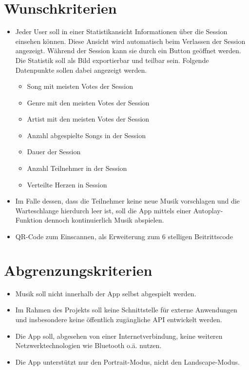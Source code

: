 \documentclass[oneside, ngerman]{sdqtechreport}
\begin{document}
\section{Wunschkriterien}
\label{sec:Zielbestimmungen:Wunschkriterien}

\begin{itemize}
    \item Jeder User soll in einer Statistikansicht Informationen über die Session einsehen können. Diese Ansicht wird automatisch beim Verlassen der Session angezeigt. Während der Session kann sie durch ein Button geöffnet werden. Die Statistik soll als Bild exportierbar und teilbar sein. 
    Folgende Datenpunkte sollen dabei angezeigt werden. 
    \begin{itemize}
        \item Song mit meisten Votes der Session
        \item Genre mit den meisten Votes der Session
        \item Artist mit den meisten Votes der Session
        \item Anzahl abgespielte Songs in der Session
        \item Dauer der Session
        \item Anzahl Teilnehmer in der Session 
        \item Verteilte Herzen in Session
    \end{itemize}
  
    \item Im Falle dessen, dass die Teilnehmer keine neue Musik vorschlagen und die Warteschlange hierdurch leer ist, soll die App mittels einer Autoplay-Funktion dennoch kontinuierlich Musik abspielen.
    \item QR-Code zum Einscannen, als Erweiterung zum 6 stelligen Beitrittscode

\end{itemize}

\section{Abgrenzungskriterien}
\label{sec:Zielbestimmungen:Abgrenzungskriterien}
\begin{itemize}
    \item Musik soll nicht innerhalb der App selbst abgespielt werden.
    \item Im Rahmen des Projekts soll keine Schnittstelle für externe Anwendungen und insbesondere keine öffentlich zugängliche API entwickelt werden.
    \item Die App soll, abgesehen von einer Internetverbindung, keine weiteren Netzwerktechnologien wie Bluetooth o.ä. nutzen.
    \item Die App unterstützt nur den Portrait-Modus, nicht den Landscape-Modus.

\end{itemize}
\end{document}
